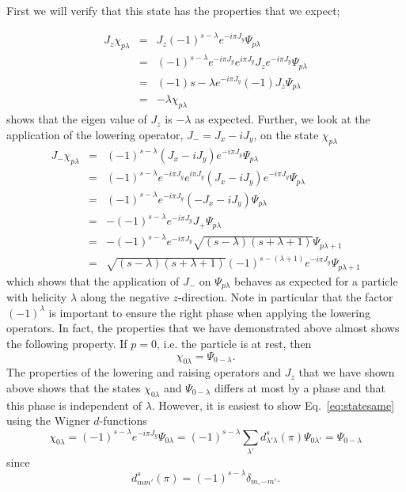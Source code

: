 First we will verify that this state has the properties that
we expect; 

\begin{eqnarray}
J_z\chi_{p\lambda} & = & J_z(-1)^{s-\lambda}e^{-i\pi J_y}\Psi_{p\lambda}\nonumber\\
                   & = & (-1)^{s-\lambda}e^{-i\pi J_y} e^{i\pi J_y} 
                          J_z e^{-i\pi J_y}\Psi_{p\lambda}\nonumber\\
                   & = & (-1){s-\lambda}e^{-i\pi J_y}(-1)J_z\Psi_{p\lambda}\nonumber\\
                   & = & -\lambda \chi_{p\lambda}
\end{eqnarray}
shows that the eigen value of $J_z$ is $-\lambda$ as expected. Further, we look
at the application of the lowering operator, $J_{-}=J_x-iJ_y$, on the 
state $\chi_{p\lambda}$
\begin{eqnarray}
J_-\chi_{p\lambda} & = & (-1)^{s-\lambda}(J_x-iJ_y)e^{-i\pi J_y}\Psi_{p\lambda}\nonumber\\
                   & = & (-1)^{s-\lambda}e^{-i\pi J_y}e^{i\pi J_y}(J_x-iJ_y)
                                         e^{-i\pi J_y}\Psi_{p\lambda}\nonumber\\
                   & = & (-1)^{s-\lambda}e^{-i\pi J_y}(-J_x-iJ_y)\Psi_{p\lambda}\nonumber\\
                   & = & -(-1)^{s-\lambda}e^{-i\pi J_y}J_+\Psi_{p\lambda}\nonumber\\
                   & = & -(-1)^{s-\lambda}e^{-i\pi J_y}\sqrt{(s-\lambda)(s+\lambda+1)}
                            \Psi_{p\lambda+1}\nonumber\\
	           & = & \sqrt{(s-\lambda)(s+\lambda+1)}(-1)^{s-(\lambda+1)}
                         e^{-i\pi J_y}\Psi_{p\lambda+1}
\end{eqnarray}
which shows that the application of $J_-$ on $\Psi_{p\lambda}$ behaves
as expected for a particle with helicity $\lambda$ along the 
negative $z$-direction. Note in particular that the factor $(-1)^{\lambda}$
is important to ensure the right phase when applying the lowering
operators. 
In fact, the properties that we have demonstrated above almost shows
the following property. If $p=0$, i.e. the particle is at rest, then
\begin{equation}
\chi_{0\lambda}=\Psi_{0-\lambda}.
\label{eq:statesame}
\end{equation}
The properties of the lowering
and raising operators and $J_z$ that we have shown above shows that the
states $\chi_{0\lambda}$ and $\Psi_{0-\lambda}$ differs at most by a 
phase and that this phase is independent of $\lambda$. However, it
is easiest to show Eq.~\ref{eq:statesame} using the Wigner 
$d$-functions
\begin{equation}
\chi_{0\lambda}=(-1)^{s-\lambda}e^{-i\pi J_y}\Psi_{0\lambda}
 = (-1)^{s-\lambda}\sum_{\lambda'}d^s_{\lambda'\lambda}(\pi)\Psi_{0\lambda'}
 = \Psi_{0-\lambda}
\end{equation}
since
\begin{equation}
d^s_{mm'}(\pi)=(-1)^{s-\lambda}\delta_{m,-m'}.
\end{equation}

